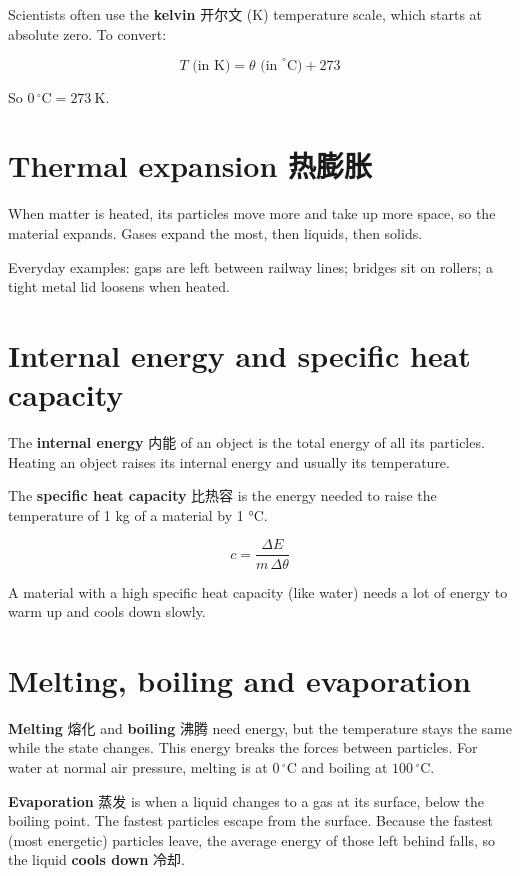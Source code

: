 \documentclass[11pt]{article}
\begin{document}
Scientists often use the \textbf{kelvin} 开尔文 (K) temperature scale, which starts at absolute zero. To convert:

\[
T\text{ (in K)} = \theta\text{ (in }^{\circ}\text{C}) + 273
\]

So $0\,^{\circ}\text{C} = 273\ \text{K}$.

\section*{Thermal expansion 热膨胀}

When matter is heated, its particles move more and take up more space, so the material expands. Gases expand the most, then liquids, then solids.

Everyday examples: gaps are left between railway lines; bridges sit on rollers; a tight metal lid loosens when heated.

\section*{Internal energy and specific heat capacity}

The \textbf{internal energy} 内能 of an object is the total energy of all its particles. Heating an object raises its internal energy and usually its temperature.

The \textbf{specific heat capacity} 比热容 is the energy needed to raise the temperature of 1 kg of a material by 1 °C.

\[
c = \frac{\Delta E}{m\,\Delta\theta}
\]

A material with a high specific heat capacity (like water) needs a lot of energy to warm up and cools down slowly.

\section*{Melting, boiling and evaporation}

\textbf{Melting} 熔化 and \textbf{boiling} 沸腾 need energy, but the temperature stays the same while the state changes. This energy breaks the forces between particles. For water at normal air pressure, melting is at $0\,^{\circ}\text{C}$ and boiling at $100\,^{\circ}\text{C}$.

\textbf{Evaporation} 蒸发 is when a liquid changes to a gas at its surface, below the boiling point. The fastest particles escape from the surface. Because the fastest (most energetic) particles leave, the average energy of those left behind falls, so the liquid \textbf{cools down} 冷却.
\end{document}
